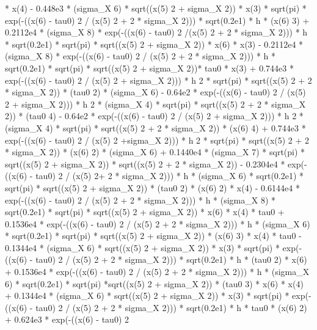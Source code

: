 \begin{maplegroup}
* x(4) - 0.448e3 * (sigma\_X  6) * sqrt((x(5)  2 + sigma\_X  2)) * x(3) * sqrt(pi) * exp(-((x(6) - tau0)  2 / (x(5)  2 + 2 * sigma\_X  2))) * sqrt(0.2e1) * h * (x(6)  3) + 0.2112e4 * (sigma\_X  8) * exp(-((x(6) - tau0)  2 /(x(5)  2 + 2 * sigma\_X  2))) * h * sqrt(0.2e1) * sqrt(pi) * sqrt((x(5)  2 + sigma\_X  2)) * x(6) * x(3) - 0.2112e4 * (sigma\_X  8) * exp(-((x(6) - tau0)  2 / (x(5)  2 + 2 * sigma\_X  2))) * h * sqrt(0.2e1) * sqrt(pi) * sqrt((x(5)  2 + sigma\_X  2))* tau0 * x(3) + 0.744e3 * exp(-((x(6) - tau0)  2 / (x(5)  2 + sigma\_X  2))) * h  2 * sqrt(pi) * sqrt((x(5)  2 + 2 * sigma\_X  2)) * (tau0  2) * (sigma\_X  6) - 0.64e2 * exp(-((x(6) - tau0)  2 / (x(5)  2 + sigma\_X  2))) * h  2 * (sigma\_X  4) * sqrt(pi) * sqrt((x(5)  2 + 2 * sigma\_X  2)) * (tau0  4) - 0.64e2 * exp(-((x(6) - tau0)  2 / (x(5)  2 + sigma\_X  2))) * h  2 * (sigma\_X  4) * sqrt(pi) * sqrt((x(5)  2 + 2 * sigma\_X  2)) * (x(6)  4) + 0.744e3 * exp(-((x(6) - tau0)  2 / (x(5)  2 +sigma\_X  2))) * h  2 * sqrt(pi) * sqrt((x(5)  2 + 2 * sigma\_X  2)) * (x(6)  2) * (sigma\_X  6) + 0.1440e4 * (sigma\_X  7) * sqrt(pi) * sqrt((x(5)  2 + sigma\_X  2)) * sqrt((x(5)  2 + 2 * sigma\_X  2)) - 0.2304e4 * exp(-((x(6) - tau0)  2 / (x(5)  2+ 2 * sigma\_X  2))) * h * (sigma\_X  6) * sqrt(0.2e1) * sqrt(pi) * sqrt((x(5)  2 + sigma\_X  2)) * (tau0  2) * (x(6)  2) * x(4) - 0.6144e4 * exp(-((x(6) - tau0)  2 / (x(5)  2 + 2 * sigma\_X  2))) * h * (sigma\_X  8) * sqrt(0.2e1) * sqrt(pi) * sqrt((x(5)  2 + sigma\_X  2)) * x(6) * x(4) * tau0 + 0.1536e4 * exp(-((x(6) - tau0)  2 / (x(5)  2 + 2 * sigma\_X  2))) * h * (sigma\_X  6) * sqrt(0.2e1) * sqrt(pi) * sqrt((x(5)  2 + sigma\_X  2)) * (x(6)  3) * x(4) * tau0 - 0.1344e4 * (sigma\_X  6) * sqrt((x(5)  2 + sigma\_X  2)) * x(3) * sqrt(pi) * exp(-((x(6) - tau0)  2 / (x(5)  2 + 2 * sigma\_X  2))) * sqrt(0.2e1) * h * (tau0  2) * x(6) + 0.1536e4 * exp(-((x(6) - tau0)  2 / (x(5)  2 + 2 * sigma\_X  2))) * h * (sigma\_X  6) * sqrt(0.2e1) * sqrt(pi) *sqrt((x(5)  2 + sigma\_X  2)) * (tau0  3) * x(6) * x(4) + 0.1344e4 * (sigma\_X  6) * sqrt((x(5)  2 + sigma\_X  2)) * x(3) * sqrt(pi) * exp(-((x(6) - tau0)  2 / (x(5)  2 + 2 * sigma\_X  2))) * sqrt(0.2e1) * h * tau0 * (x(6)  2) + 0.624e3 * exp(-((x(6) - tau0)  2 
\end{maplegroup}
